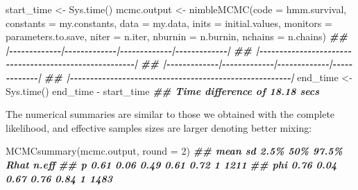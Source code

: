 \documentclass[
  12pt,
]{krantz}
\newenvironment{Shaded}{\begin{snugshade}}{\end{snugshade}}
\newcommand{\AttributeTok}[1]{\textcolor[rgb]{0.77,0.63,0.00}{#1}}
\newcommand{\DecValTok}[1]{\textcolor[rgb]{0.00,0.00,0.81}{#1}}
\newcommand{\DocumentationTok}[1]{\textcolor[rgb]{0.56,0.35,0.01}{\textbf{\textit{#1}}}}
\newcommand{\FunctionTok}[1]{\textcolor[rgb]{0.00,0.00,0.00}{#1}}
\newcommand{\NormalTok}[1]{#1}
\newcommand{\OtherTok}[1]{\textcolor[rgb]{0.56,0.35,0.01}{#1}}
\newcommand{\SpecialCharTok}[1]{\textcolor[rgb]{0.00,0.00,0.00}{#1}}
\begin{document}
\begin{Shaded}
\begin{Highlighting}[]
\NormalTok{start\_time }\OtherTok{\textless{}{-}} \FunctionTok{Sys.time}\NormalTok{()}
\NormalTok{mcmc.output }\OtherTok{\textless{}{-}} \FunctionTok{nimbleMCMC}\NormalTok{(}\AttributeTok{code =}\NormalTok{ hmm.survival,}
                          \AttributeTok{constants =}\NormalTok{ my.constants,}
                          \AttributeTok{data =}\NormalTok{ my.data,}
                          \AttributeTok{inits =}\NormalTok{ initial.values,}
                          \AttributeTok{monitors =}\NormalTok{ parameters.to.save,}
                          \AttributeTok{niter =}\NormalTok{ n.iter,}
                          \AttributeTok{nburnin =}\NormalTok{ n.burnin,}
                          \AttributeTok{nchains =}\NormalTok{ n.chains)}
\DocumentationTok{\#\# |{-}{-}{-}{-}{-}{-}{-}{-}{-}{-}{-}{-}{-}|{-}{-}{-}{-}{-}{-}{-}{-}{-}{-}{-}{-}{-}|{-}{-}{-}{-}{-}{-}{-}{-}{-}{-}{-}{-}{-}|{-}{-}{-}{-}{-}{-}{-}{-}{-}{-}{-}{-}{-}|}
\DocumentationTok{\#\# |{-}{-}{-}{-}{-}{-}{-}{-}{-}{-}{-}{-}{-}{-}{-}{-}{-}{-}{-}{-}{-}{-}{-}{-}{-}{-}{-}{-}{-}{-}{-}{-}{-}{-}{-}{-}{-}{-}{-}{-}{-}{-}{-}{-}{-}{-}{-}{-}{-}{-}{-}{-}{-}{-}{-}|}
\DocumentationTok{\#\# |{-}{-}{-}{-}{-}{-}{-}{-}{-}{-}{-}{-}{-}|{-}{-}{-}{-}{-}{-}{-}{-}{-}{-}{-}{-}{-}|{-}{-}{-}{-}{-}{-}{-}{-}{-}{-}{-}{-}{-}|{-}{-}{-}{-}{-}{-}{-}{-}{-}{-}{-}{-}{-}|}
\DocumentationTok{\#\# |{-}{-}{-}{-}{-}{-}{-}{-}{-}{-}{-}{-}{-}{-}{-}{-}{-}{-}{-}{-}{-}{-}{-}{-}{-}{-}{-}{-}{-}{-}{-}{-}{-}{-}{-}{-}{-}{-}{-}{-}{-}{-}{-}{-}{-}{-}{-}{-}{-}{-}{-}{-}{-}{-}{-}|}
\NormalTok{end\_time }\OtherTok{\textless{}{-}} \FunctionTok{Sys.time}\NormalTok{()}
\NormalTok{end\_time }\SpecialCharTok{{-}}\NormalTok{ start\_time}
\DocumentationTok{\#\# Time difference of 18.18 secs}
\end{Highlighting}
\end{Shaded}

The numerical summaries are similar to those we obtained with the complete likelihood, and effective samples sizes are larger denoting better mixing:

\begin{Shaded}
\begin{Highlighting}[]
\FunctionTok{MCMCsummary}\NormalTok{(mcmc.output, }\AttributeTok{round =} \DecValTok{2}\NormalTok{)}
\DocumentationTok{\#\#     mean   sd 2.5\%  50\% 97.5\% Rhat n.eff}
\DocumentationTok{\#\# p   0.61 0.06 0.49 0.61  0.72    1  1211}
\DocumentationTok{\#\# phi 0.76 0.04 0.67 0.76  0.84    1  1483}
\end{Highlighting}
\end{Shaded}
\end{document}
